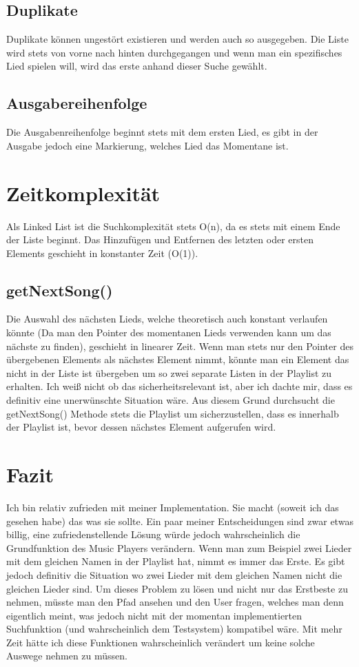 \documentclass{article}
\begin{document}
	\subsection*{Duplikate}
	Duplikate können ungestört existieren und werden auch so ausgegeben.
	Die Liste wird stets von vorne nach hinten durchgegangen und wenn man ein spezifisches Lied spielen will, wird das erste anhand dieser Suche gewählt.
	\subsection*{Ausgabereihenfolge}
	Die Ausgabenreihenfolge beginnt stets mit dem ersten Lied, es gibt in der Ausgabe jedoch eine Markierung, welches Lied das Momentane ist.
	\section*{Zeitkomplexität}
	Als Linked List ist die Suchkomplexität stets O(n), da es stets mit einem Ende der Liste beginnt. Das Hinzufügen und Entfernen des letzten oder ersten Elements geschieht in konstanter Zeit (O(1)). 
	\subsection*{getNextSong()}
	Die Auswahl des nächsten Lieds, welche theoretisch auch konstant verlaufen könnte (Da man den Pointer des momentanen Lieds verwenden kann um das nächste zu finden), geschieht in linearer Zeit. Wenn man stets nur den Pointer des übergebenen Elements als nächstes Element nimmt, könnte man ein Element das nicht in der Liste ist übergeben um so zwei separate Listen in der Playlist zu erhalten. Ich weiß nicht ob das sicherheitsrelevant ist, aber ich dachte mir, dass es definitiv eine unerwünschte Situation wäre. Aus diesem Grund durchsucht die getNextSong() Methode stets die Playlist um sicherzustellen, dass es innerhalb der Playlist ist, bevor dessen nächstes Element aufgerufen wird.
	\section*{Fazit}
	Ich bin relativ zufrieden mit meiner Implementation. Sie macht (soweit ich das gesehen habe) das was sie sollte. Ein paar meiner Entscheidungen sind zwar etwas billig, eine zufriedenstellende Lösung würde jedoch wahrscheinlich die Grundfunktion des Music Players verändern. Wenn man zum Beispiel zwei Lieder mit dem gleichen Namen in der Playlist hat, nimmt es immer das Erste. Es gibt jedoch definitiv die Situation wo zwei Lieder mit dem gleichen Namen nicht die gleichen Lieder sind. Um dieses Problem zu lösen und nicht nur das Erstbeste zu nehmen, müsste man den Pfad ansehen und den User fragen, welches man denn eigentlich meint, was jedoch nicht mit der momentan implementierten Suchfunktion (und wahrscheinlich dem Testsystem) kompatibel wäre. Mit mehr Zeit hätte ich diese Funktionen wahrscheinlich verändert um keine solche Auswege nehmen zu müssen.

	























  
\end{document}
